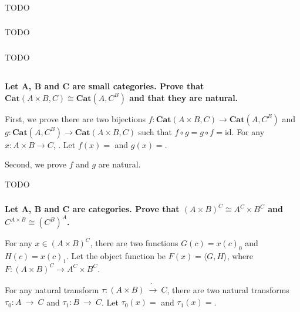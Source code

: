 \documentclass{article}
\begin{document}
\subsubsection{}
TODO

\subsubsection{}
TODO

\subsubsection{}
TODO

\subsection{}

\subsubsection{}

\textbf{Let A, B and C are small categories. Prove that $\mathbf{Cat}(A \times B, C) \cong \mathbf{Cat}(A, C^B)$ and that they are natural.}

First, we prove there are two bijections $f : \mathbf{Cat}(A \times B, C) \rightarrow \mathbf{Cat}(A, C^B)$ and $g : \mathbf{Cat}(A, C^B) \rightarrow \mathbf{Cat}(A \times B, C)$ such that $f \circ g = g \circ f = \mathrm{id}$. For any $x : A \times B \rightarrow C$, . Let $f(x) = $ and $g(x) = $.

Second, we prove $f$ and $g$ are natural.


TODO

\subsubsection{}

\textbf{Let A, B and C are categories. Prove that $(A \times B)^C \cong A^C \times B^C$ and $C^{A \times B} \cong (C^B)^A$.}

For any $x \in (A \times B)^C$, there are two functions $G(c) = x(c)_0$ and $H(c) = x(c)_1$. Let the object function be $F(x) = \langle G, H \rangle$, where $F : (A \times B)^C \rightarrow A^C \times B^C$.

For any natural transform $\tau : (A \times B)\ \dot{\rightarrow}\ C$, there are two natural transforms $\tau_0 : A\ \dot{\rightarrow}\ C$ and $\tau_1 : B\ \dot{\rightarrow}\ C$. Let $\tau_0(x) = $ and $\tau_1(x) = $.
\end{document}
